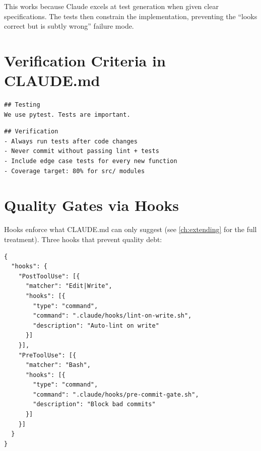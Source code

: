 This works because Claude excels at test generation when given
clear specifications. The tests then constrain the implementation,
preventing the ``looks correct but is subtly wrong'' failure mode.


\section{Verification Criteria in CLAUDE.md}
\label{sec:verification-criteria}

\begin{fullwidth}
\begin{beforeafter}
\before
\begin{verbatim}
## Testing
We use pytest. Tests are important.
\end{verbatim}

\after
\begin{verbatim}
## Verification
- Always run tests after code changes
- Never commit without passing lint + tests
- Include edge case tests for every new function
- Coverage target: 80% for src/ modules
\end{verbatim}
\end{beforeafter}
\end{fullwidth}


\section{Quality Gates via Hooks}
\label{sec:quality-gates}

Hooks enforce what CLAUDE.md can only suggest (see \cref{ch:extending}
for the full treatment). Three hooks that prevent quality debt:

\begin{verbatim}
{
  "hooks": {
    "PostToolUse": [{
      "matcher": "Edit|Write",
      "hooks": [{
        "type": "command",
        "command": ".claude/hooks/lint-on-write.sh",
        "description": "Auto-lint on write"
      }]
    }],
    "PreToolUse": [{
      "matcher": "Bash",
      "hooks": [{
        "type": "command",
        "command": ".claude/hooks/pre-commit-gate.sh",
        "description": "Block bad commits"
      }]
    }]
  }
}
\end{verbatim}

